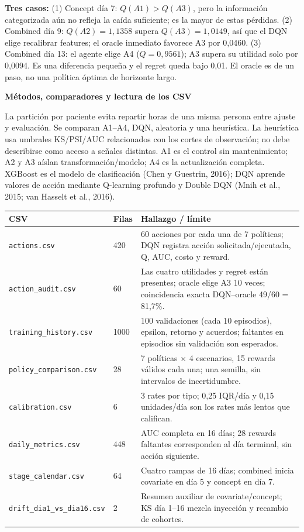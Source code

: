 \documentclass[10pt,a4paper]{article}
\newcommand{\smallsection}[1]{\vspace{2pt}\textbf{\large #1}\par\vspace{1pt}}
\begin{document}
\textbf{Tres casos:} (1) Concept día 7: \(Q(A1)>Q(A3)\), pero la información
categorizada aún no refleja la caída suficiente; es la mayor de estas pérdidas.
(2) Combined día 9: \(Q(A2)=1{,}1358\) supera \(Q(A3)=1{,}0149\), así que el DQN
elige recalibrar features; el oracle inmediato favorece A3 por 0,0460.
(3) Combined día 13: el agente elige A4 (\(Q=0{,}9561\)); A3 supera su utilidad
solo por 0,0094. Es una diferencia pequeña y el regret queda bajo 0,01.
El oracle es de un paso, no una política óptima de horizonte largo.

\newpage
\smallsection{Métodos, comparadores y lectura de los CSV}
La partición por paciente evita repartir horas de una misma persona entre
ajuste y evaluación. Se comparan A1--A4, DQN, aleatoria y una heurística.
La heurística usa umbrales KS/PSI/AUC relacionados con los cortes de
observación; no debe describirse como acceso a señales distintas. A1 es el
control sin mantenimiento; A2 y A3 aíslan transformación/modelo; A4 es la
actualización completa. XGBoost es el modelo de clasificación
(Chen y Guestrin, 2016); DQN aprende valores de acción mediante Q-learning
profundo y Double DQN (Mnih et al., 2015; van Hasselt et al., 2016).

\scriptsize
\begin{tabularx}{\textwidth}{@{}p{}p{}Y@{}}
\toprule
\textbf{CSV} & \textbf{Filas} & \textbf{Hallazgo / límite} \\
\midrule
\texttt{actions.csv} & 420 & 60 acciones por cada una de 7 políticas; DQN registra acción solicitada/ejecutada, Q, AUC, costo y reward. \\
\texttt{action\_audit.csv} & 60 & Las cuatro utilidades y regret están presentes; oracle elige A3 10 veces; coincidencia exacta DQN--oracle 49/60 = 81,7\%. \\
\texttt{training\_history.csv} & 1000 & 100 validaciones (cada 10 episodios), epsilon, retorno y acuerdos; faltantes en episodios sin validación son esperados. \\
\texttt{policy\_comparison.csv} & 28 & 7 políticas \(\times\) 4 escenarios, 15 rewards válidos cada una; una semilla, sin intervalos de incertidumbre. \\
\texttt{calibration.csv} & 6 & 3 rates por tipo; 0,25 IQR/día y 0,15 unidades/día son los rates más lentos que califican. \\
\texttt{daily\_metrics.csv} & 448 & AUC completa en 16 días; 28 rewards faltantes corresponden al día terminal, sin acción siguiente. \\
\texttt{stage\_calendar.csv} & 64 & Cuatro rampas de 16 días; combined inicia covariate en día 5 y concept en día 7. \\
\texttt{drift\_dia1\_vs\_dia16.csv} & 2 & Resumen auxiliar de covariate/concept; KS día 1--16 mezcla inyección y recambio de cohortes. \\
\bottomrule
\end{tabularx}
\small
\end{document}
